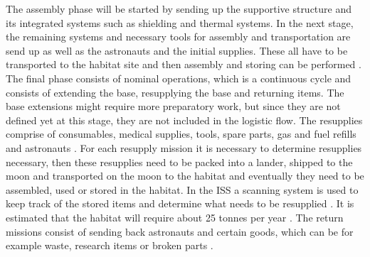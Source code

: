 The assembly phase will be started by sending up the supportive structure and its integrated systems such as shielding and thermal systems. In the next stage, the remaining systems and necessary tools for assembly and transportation are send up as well as the astronauts and the initial supplies. These all have to be transported to the habitat site and then assembly and storing can be performed \cite{NexGen}.\\ 



The final phase consists of nominal operations, which is a continuous cycle and consists of extending the base, resupplying the base and returning items. The base extensions might require more preparatory work, but since they are not defined yet at this stage, they are not included in the logistic flow. The resupplies comprise of consumables, medical supplies, tools, spare parts, gas and fuel refills and astronauts \cite{Haughton}. For each resupply mission it is necessary to determine resupplies necessary, then these resupplies need to be packed into a lander, shipped to the moon and transported on the moon to the habitat and eventually they need to be assembled, used or stored in the habitat. In the ISS a scanning system is used to keep track of the stored items and determine what needs to be resupplied \cite{Logis}. It is estimated that the habitat will require about 25 tonnes per year \cite{DRLS}. The return missions consist of sending back astronauts and certain goods, which can be for example waste, research items or broken parts \cite{Logis}.







